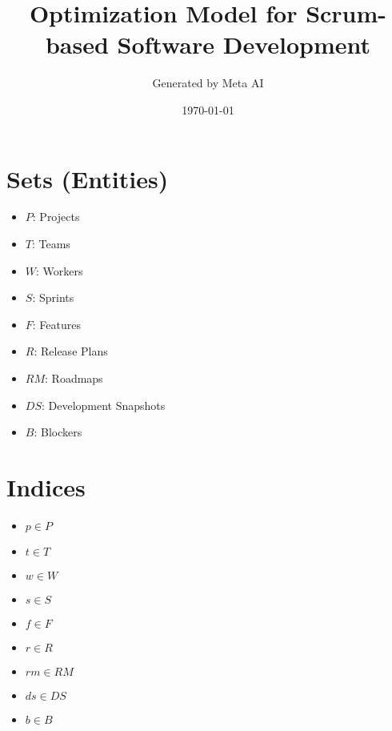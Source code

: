 \documentclass{article}
\title{Optimization Model for Scrum-based Software Development}
\author{Generated by Meta AI}
\date{\today}
\begin{document}
\maketitle
\tableofcontents

\section{Sets (Entities)}
\begin{itemize}
    \item $P$: Projects
    \item $T$: Teams
    \item $W$: Workers
    \item $S$: Sprints
    \item $F$: Features
    \item $R$: Release Plans
    \item $RM$: Roadmaps
    \item $DS$: Development Snapshots
    \item $B$: Blockers
\end{itemize}

\section{Indices}
\begin{itemize}
    \item $p \in P$
    \item $t \in T$
    \item $w \in W$
    \item $s \in S$
    \item $f \in F$
    \item $r \in R$
    \item $rm \in RM$
    \item $ds \in DS$
    \item $b \in B$
\end{itemize}
\end{document}
